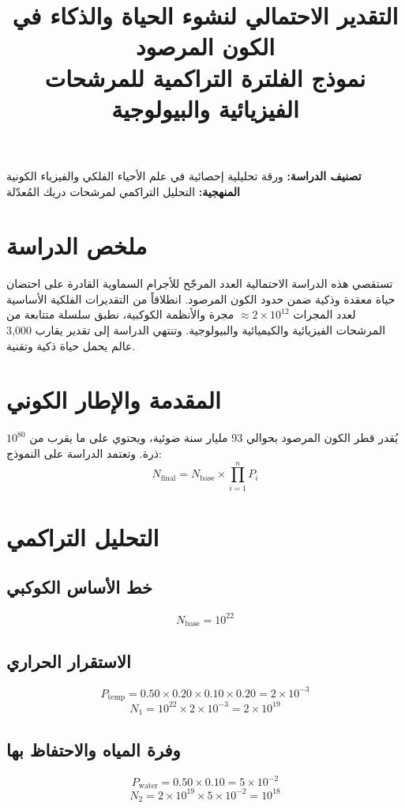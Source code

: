 \documentclass[12pt,a4paper]{article}
\title{\textbf{التقدير الاحتمالي لنشوء الحياة والذكاء في الكون المرصود}\\
\large نموذج الفلترة التراكمية للمرشحات الفيزيائية والبيولوجية}
\author{}
\date{}
\begin{document}
\maketitle

\noindent\textbf{تصنيف الدراسة:} ورقة تحليلية إحصائية في علم الأحياء الفلكي والفيزياء الكونية\\
\textbf{المنهجية:} التحليل التراكمي لمرشحات دريك المُعدّلة

\section*{ملخص الدراسة}
تستقصي هذه الدراسة الاحتمالية العدد المرجّح للأجرام السماوية القادرة على احتضان حياة معقدة وذكية ضمن حدود الكون المرصود. انطلاقاً من التقديرات الفلكية الأساسية لعدد المجرات \(\approx 2\times10^{12}\) مجرة والأنظمة الكوكبية، نطبق سلسلة متتابعة من المرشحات الفيزيائية والكيميائية والبيولوجية. وتنتهي الدراسة إلى تقدير يقارب 3,000 عالم يحمل حياة ذكية وتقنية.

\section{المقدمة والإطار الكوني}
يُقدر قطر الكون المرصود بحوالي 93 مليار سنة ضوئية، ويحتوي على ما يقرب من \(10^{80}\) ذرة. وتعتمد الدراسة على النموذج:
\[
N_{\mathrm{final}}=N_{\mathrm{base}}\times\prod_{i=1}^{n}P_i
\]

\section{التحليل التراكمي}

\subsection{خط الأساس الكوكبي}
\[
N_{\mathrm{base}}=10^{22}
\]

\subsection{الاستقرار الحراري}
\[
P_{\mathrm{temp}}=0.50\times0.20\times0.10\times0.20
=2\times10^{-3}
\]
\[
N_1=10^{22}\times2\times10^{-3}=2\times10^{19}
\]

\subsection{وفرة المياه والاحتفاظ بها}
\[
P_{\mathrm{water}}=0.50\times0.10=5\times10^{-2}
\]
\[
N_2=2\times10^{19}\times5\times10^{-2}=10^{18}
\]
\end{document}
